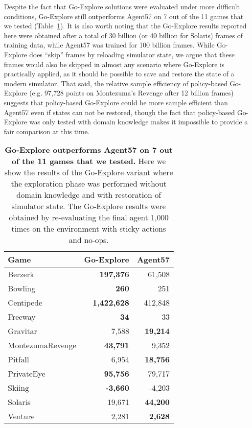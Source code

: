 \documentclass{nature}
\begin{document}
Despite the fact that Go-Explore solutions were evaluated under more difficult conditions, Go-Explore still outperforms Agent57 on 7 out of the 11 games that we tested (Table~\ref{tab:ge_vs_agent57}).
It is also worth noting that the Go-Explore results reported here were obtained after a total of 30 billion (or 40 billion for Solaris) frames of training data, while Agent57 was trained for 100 billion frames.
While Go-Explore does ``skip'' frames by reloading simulator state, we argue that these frames would also be skipped in almost any scenario where Go-Explore is practically applied, as it should be possible to save and restore the state of a modern simulator.
That said, the relative sample efficiency of policy-based Go-Explore (e.g. 97,728 points on Montezuma's Revenge after 12 billion frames) suggests that policy-based Go-Explore could be more sample efficient than Agent57 even if states can not be restored, though the fact that policy-based Go-Explore was only tested with domain knowledge makes it impossible to provide a fair comparison at this time.

\begin{table}
\centering
\fontsize{9}{10.5}\selectfont
\begin{tabular}{l|rr}{} 
Game &     Go-Explore & Agent57  \\
\hline
Berzerk          &   \textbf{197,376} &       61,508 \\
Bowling          &       \textbf{260} &          251 \\
Centipede        & \textbf{1,422,628} &      412,848 \\
Freeway          &        \textbf{34} &           33 \\
Gravitar         &     7,588 &       \textbf{19,214} \\
MontezumaRevenge &    \textbf{43,791} &        9,352 \\
Pitfall          &     6,954 &       \textbf{18,756} \\
PrivateEye       &    \textbf{95,756} &       79,717 \\
Skiing           &    \textbf{-3,660} &       -4,203 \\
Solaris          &    19,671 &       \textbf{44,200} \\
Venture          &     2,281 &        \textbf{2,628} \\
\end{tabular}
\caption{\textbf{Go-Explore outperforms Agent57 on 7 out of the 11 games that we tested.} Here we show the results of the Go-Explore variant where the exploration phase was performed without domain knowledge and with restoration of simulator state. The Go-Explore results were obtained by re-evaluating the final agent 1,000 times on the environment with sticky actions and no-ops. }
\label{tab:ge_vs_agent57}
\end{table}
\end{document}
